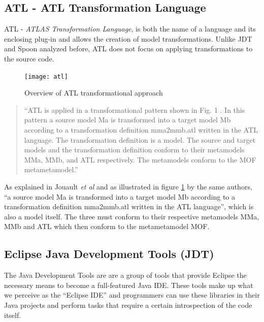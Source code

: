 \subsection{ATL - ATL Transformation Language }
	ATL - \emph{ATLAS Transformation Language}, is both the name of a language and its enclosing plug-in and allows the creation of model transformations. Unlike JDT and Spoon analyzed before, ATL does not focus on applying transformations to the source code.

	\begin{figure}[h]
	  \begin{center}
	    \leavevmode
	    \texttt{[image: atl]}
	    \caption{Overview of ATL transformational approach \cite{jouault2006transforming}}
	    \label{fig:so-atl-wow}
	  \end{center}
	\end{figure}

	\begin{quote}
		``ATL is applied in a transformational pattern shown in Fig. 1 . In this pattern a source model Ma is transformed into a target model Mb according to a transformation definition mma2mmb.atl written in the ATL language. The transformation definition is a model. The source and target models and the transformation definition conform to their metamodels MMa, MMb, and ATL respectively. The metamodels conform to the MOF metametamodel.''
	\end{quote}

	As explained in Jouault \emph{et al} and as illustrated in figure \ref{fig:so-atl-wow} by the same authors, ``a source model Ma is transformed into a target model Mb according to a transformation definition mma2mmb.atl written in the ATL language'', which is also a model itself. The three must conform to their respective metamodels MMa, MMb and ATL which then conform to the metametamodel MOF.

\subsection{Eclipse Java Development Tools (JDT)}

	The Java Development Tools are are a group of tools that provide Eclipse the necessary means to become a full-featured Java IDE.
	These tools make up what we perceive as the ``Eclipse IDE'' and programmers can use these libraries in their Java projects and perform tasks that require a certain introspection of the code itself. 

